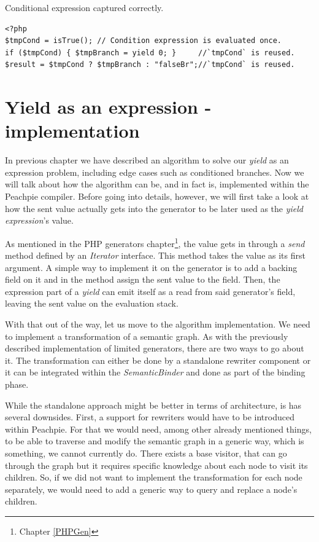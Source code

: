 \begin{listing}[H]
\caption{Conditional expression captured correctly.}
\label{list5.3:CondCorrect}
\begin{verbatim}
<?php
$tmpCond = isTrue(); // Condition expression is evaluated once.
if ($tmpCond) { $tmpBranch = yield 0; }     //`tmpCond` is reused.
$result = $tmpCond ? $tmpBranch : "falseBr";//`tmpCond` is reused.
\end{verbatim}
\end{listing}

\section{Yield as an expression - implementation}

In previous chapter we have described an algorithm to solve our \emph{yield} as an expression problem, including edge cases such as conditioned branches. Now we will talk about how the algorithm can be, and in fact is, implemented within the Peachpie compiler. Before going into details, however, we will first take a look at how the sent value actually gets into the generator to be later used as the \emph{yield expression}’s value. 

As mentioned in the PHP generators chapter\footnote{Chapter \ref{PHPGen}}, the value gets in through a \emph{send} method defined by an \emph{Iterator} interface. This method takes the value as its first argument. A simple way to implement it on the generator is to add a backing field on it and in the method assign the sent value to the field. Then, the expression part of a \emph{yield} can emit itself as a read from said generator’s field, leaving the sent value on the evaluation stack.

With that out of the way, let us move to the algorithm implementation. We need to implement a transformation of a semantic graph. As with the previously described implementation of limited generators, there are two ways to go about it. The transformation can either be done by a standalone rewriter component or it can be integrated within the \emph{SemanticBinder} and done as part of the binding phase.

While the standalone approach might be better in terms of architecture, is has several downsides. First, a support for rewriters would have to be introduced within Peachpie. For that we would need, among other already mentioned things, to be able to traverse and modify the semantic graph in a generic way, which is something, we cannot currently do. There exists a base visitor, that can go through the graph but it requires specific knowledge about each node to visit its children. So, if we did not want to implement the transformation for each node separately, we would need to add a generic way to query and replace a node’s children. 


